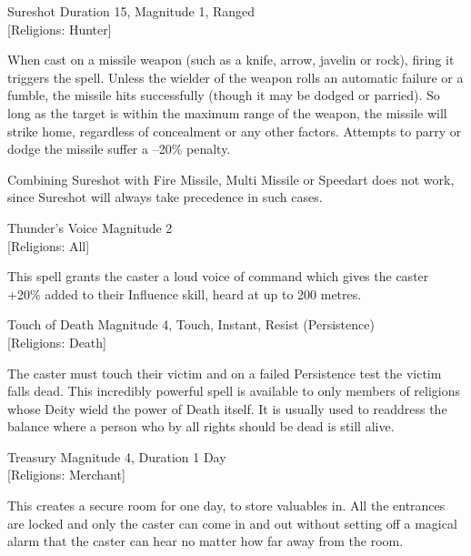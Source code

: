 \begin{rpg-spell}
{Sureshot}
{Duration 15, Magnitude 1, Ranged\\{[Religions: Hunter]}}

When cast on a missile weapon (such as a knife, arrow, javelin or rock), firing it triggers the spell. Unless the wielder of the weapon rolls an automatic failure or a fumble, the missile hits successfully (though it may be dodged or parried). So long as the target is within the maximum range of the weapon, the missile will strike home, regardless of concealment or any other factors. Attempts to parry or dodge the missile suffer a –20\% penalty.

Combining Sureshot with Fire Missile, Multi Missile or Speedart does not work, since Sureshot will always take precedence in such cases.
\end{rpg-spell}


\begin{rpg-spell}
{Thunder's Voice}
{Magnitude 2\\{[Religions: All]}}

This spell grants the caster a loud voice of command which gives the caster +20\% added to their Influence skill, heard at up to 200 metres.
\end{rpg-spell}


\begin{rpg-spell}
{Touch of Death}
{Magnitude 4, Touch, Instant, Resist (Persistence)\\{[Religions: Death]}}

The caster must touch their victim and on a failed Persistence test the victim falls dead. This incredibly powerful spell is available to only members of religions whose Deity wield the power of Death itself. It is usually used to readdress the balance where a person who by all rights should be dead is still alive. 
\end{rpg-spell}


\begin{rpg-spell}
{Treasury}
{Magnitude 4, Duration 1 Day\\{[Religions: Merchant]}}

This creates a secure room for one day, to store valuables in. All the entrances are locked and only the caster can come in and out without setting off a magical alarm that the caster can hear no matter how far away from the room.
\end{rpg-spell}

